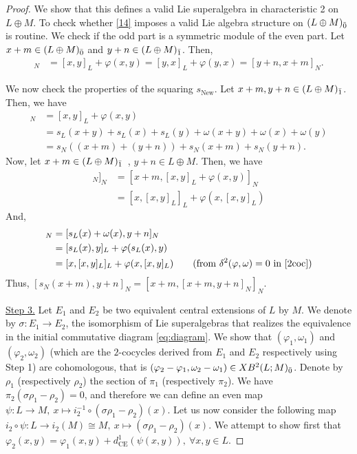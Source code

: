 \documentclass[12pt]{amsart}
\newcommand {\ce}{{\text{CE}}}
\begin{document}
\begin{proof}
We show that this defines a valid Lie superalgebra in characteristic 2 on $L\oplus M$. To check whether \eqref{14} imposes a valid Lie algebra structure on $(L \oplus M)_{{\bar0}}$ is routine. We check if the odd part is a symmetric module of the even part. Let $x+m \in (L \oplus M)_{{\bar0}}$ and $y+n \in (L \oplus M)_{{\bar1}}$. Then,
    \begin{align*}
        [x+m, y+n]_{N} &= [x,y]_{L}+ \varphi(x,y)=[y,x]_{L}+\varphi(y,x)=[y+n, x+m]_{N}.
    \end{align*}

We now check the properties of the squaring $s_{\mathrm{New}}$. Let $x+m, y+n \in (L \oplus M)_{{\bar1}}$. Then, we have 
        \begin{align*}
            [x+m,y+n]_{N}&=[x,y]_{L}+\varphi(x,y)\\
            &=s_L(x+y)+s_L(x)+s_L(y)+\omega(x+y)+\omega(x)+\omega(y)\\
            &=s_N((x+m)+(y+n))+s_N(x+m)+s_N(y+n).
        \end{align*}
Now, let $x+m \in (L\oplus M)_{{\bar1}}$ \,, $y+n \in L \oplus M$. Then, we have 
        \begin{align*}
            [x+m,[x+m,y+n]_{N}]_{N}&=[x+m,[x,y]_{L}+\varphi(x,y)]_{N}\\
            &=[x,[x,y]_{L}]_{L}+\varphi(x,[x,y]_{L})
        \end{align*}
        And,
        \begin{align*}
            [s_{N}(x+m), y+n]_{N}&=[s_{L}(x)+\omega(x), y+n]_{N}\\
            &=[s_L(x),y]_{L}+\varphi(s_L(x),y)\\
            &=[x,[x,y]_L]_L+\varphi(x,[x,y]_L) \qquad \mathrm{(from} \ \delta^2(\varphi,\omega)=0 \text{ in  \eqref{2coc})}\\
        \end{align*}
Thus, $[s_{N}(x+m), y+n]_{N}=[x+m,[x+m,y+n]_{N}]_{N}$.

\vspace{1em}

\noindent\underline{Step 3.} Let $E_{1}$ and $E_{2}$ be two equivalent central extensions of $L$ by $M$. We denote by $\sigma:E_1 \longrightarrow E_2$, the isomorphism of Lie superalgebras that realizes the equivalence in the initial commutative diagram \eqref{eq:diagram}. We show that $(\varphi_1,\omega_1)$ and $(\varphi_2,\omega_2)$ (which are the $2$-cocycles derived from $E_1$ and $E_2$ respectively using Step 1) are cohomologous, that is $(\varphi_2-\varphi_1, \omega_2-\omega_1) \in XB^2(L;M)_{{\bar0}}$. Denote by $\rho_1$ (respectively $\rho_2$) the section of $\pi_1$ (respectively $\pi_2$). We have $\pi_2(\sigma\rho_1-\rho_2)=0$, and therefore we can define an even map $\psi:L\longrightarrow M, \ x\longmapsto i_2^{-1}\circ(\sigma\rho_1-\rho_2)(x)$. Let us now consider the following map $i_2 \circ\psi:L\longrightarrow i_2(M) \cong M, \ x\longmapsto(\sigma\rho_1-\rho_2)(x)$. We attempt to show first that $\varphi_2(x,y)=\varphi_1(x,y)+d_{\ce}^1(\psi(x,y)), \ \forall x,y \in L$.


\end{proof}
\end{document}

